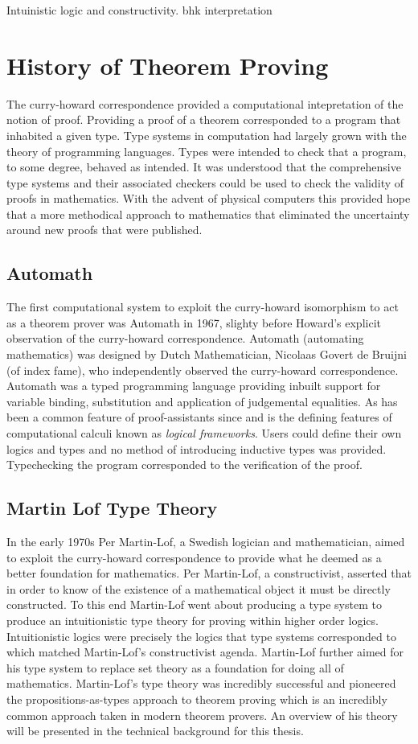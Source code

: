 Intuinistic logic and constructivity. bhk interpretation

\section{History of Theorem Proving}
The curry-howard correspondence provided a computational intepretation of the
notion of proof. Providing a proof of a theorem corresponded to a program that
inhabited a given type. Type systems in computation had largely grown with the
theory of programming languages. Types were intended to check that a program, to
some degree, behaved as intended. It was understood that the comprehensive type
systems and their associated checkers could be used to check the validity of
proofs in mathematics. With the advent of physical computers this provided hope
that a more methodical approach to mathematics that eliminated the uncertainty
around new proofs that were published.
\subsection{Automath}
The first computational system to exploit the curry-howard isomorphism to act as
a theorem prover was Automath in 1967, slighty before Howard's explicit
observation of the curry-howard correspondence. Automath (automating
mathematics) was designed by Dutch Mathematician, Nicolaas Govert de Bruijni (of
index fame), who independently observed the curry-howard correspondence.
Automath was a typed programming language providing inbuilt support for variable
binding, substitution and application of judgemental equalities. As has been
a common feature of proof-assistants since and is the defining features of
computational calculi known as \textit{logical frameworks}. Users could
define their own logics and types and no method of introducing inductive types
was provided. Typechecking the program corresponded to the verification of the
proof. 

\subsection{Martin Lof Type Theory}
In the early 1970s Per Martin-Lof, a Swedish logician and mathematician, aimed
to exploit the curry-howard correspondence to provide what he deemed as a better
foundation for mathematics. Per Martin-Lof, a constructivist, asserted that in
order to know of the existence of a mathematical object it must be directly
constructed. To this end Martin-Lof went about producing a type system to
produce an intuitionistic type theory for proving within higher order logics.
Intuitionistic logics were precisely the logics that type systems corresponded
to which matched Martin-Lof's constructivist agenda. Martin-Lof further aimed
for his type system to replace set theory as a foundation for doing all of
mathematics. Martin-Lof's type theory was incredibly successful and pioneered
the propositions-as-types approach to theorem proving which is an incredibly
common approach taken in modern theorem provers. An overview of his theory will
be presented in the technical background for this thesis.

